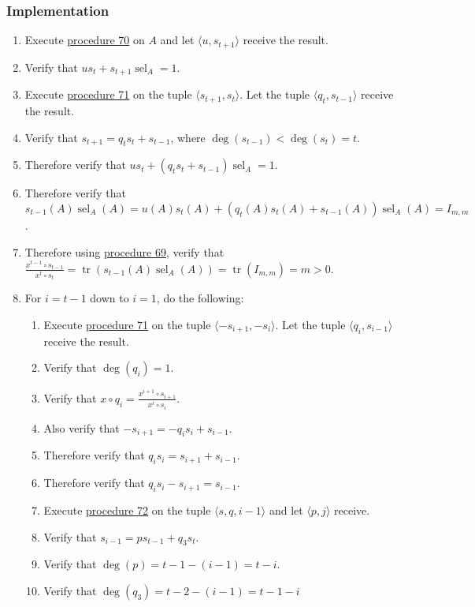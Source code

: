 \documentclass[twocolumn]{article}
\DeclareMathOperator{\tr}{tr}
\DeclareMathOperator{\sel}{sel}
\begin{document}
			\subsubsection{Implementation}
				\begin{enumerate}
					\item Execute \hyperref[sec:procedure 70]{procedure 70} on $A$ and let $\langle u,s_{t+1}\rangle$ receive the result.
					\item Verify that $us_t+s_{t+1}\sel_A=1$.
					\item Execute \hyperref[sec:procedure 71]{procedure 71} on the tuple $\langle s_{t+1},s_t\rangle$. Let the tuple $\langle q_t,s_{t-1}\rangle$ receive the result.
					\item Verify that $s_{t+1}=q_ts_t+s_{t-1}$, where $\deg(s_{t-1})<\deg(s_t)=t$.
					\item Therefore verify that $us_t+(q_ts_t+s_{t-1})\sel_A=1$.
					\item Therefore verify that $s_{t-1}(A)\sel_A(A)=u(A)s_t(A)+(q_t(A)s_t(A)+s_{t-1}(A))\sel_A(A)=I_{m,m}$.
					\item Therefore using \hyperref[sec:procedure 69]{procedure 69}, verify that $\frac{x^{t-1}\circ s_{t-1}}{x^t\circ s_t}=\tr(s_{t-1}(A)\sel_A(A))=\tr(I_{m,m})=m>0$.
					\item For $i=t-1$ down to $i=1$, do the following:
					\begin{enumerate}
						\item Execute \hyperref[sec:procedure 71]{procedure 71} on the tuple $\langle -s_{i+1},-s_i\rangle$. Let the tuple $\langle q_i,s_{i-1}\rangle$ receive the result.
						\item Verify that $\deg(q_i)=1$.
						\item Verify that $x\circ q_i=\frac{x^{i+1}\circ s_{i+1}}{x^i\circ s_i}$.
						\item Also verify that $-s_{i+1}=-q_is_i+s_{i-1}$.
						\item Therefore verify that $q_is_i=s_{i+1}+s_{i-1}$.
						\item Therefore verify that $q_is_i-s_{i+1}=s_{i-1}$.
						\item Execute \hyperref[sec:procedure 72]{procedure 72} on the tuple $\langle s,q,i-1\rangle$ and let $\langle p,j\rangle$ receive.
						\item Verify that $s_{i-1}=ps_{t-1}+q_3s_t$.
						\item Verify that $\deg(p)=t-1-(i-1)=t-i$.
						\item Verify that $\deg(q_3)=t-2-(i-1)=t-1-i$

\end{enumerate}
\end{enumerate}
\end{document}
